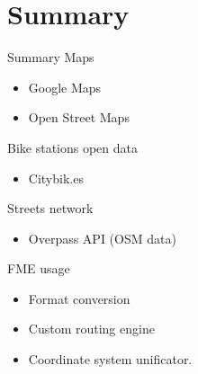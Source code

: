 \documentclass[10pt, compress]{beamer}
\begin{document}
{
\begin{frame}[plain]
\end{frame}
}



\section{Summary}

\begin{frame}{Summary}
    Maps
    \begin{itemize}
        \item Google Maps
        \item Open Street Maps
    \end{itemize}
    Bike stations open data
    \begin{itemize}
        \item Citybik.es
    \end{itemize}
    Streets network
    \begin{itemize}
        \item Overpass API (OSM data)
    \end{itemize}
    FME usage
    \begin{itemize}
        \item Format conversion
        \item Custom routing engine
        \item Coordinate system unificator.
    \end{itemize}

\end{frame}
\end{document}
